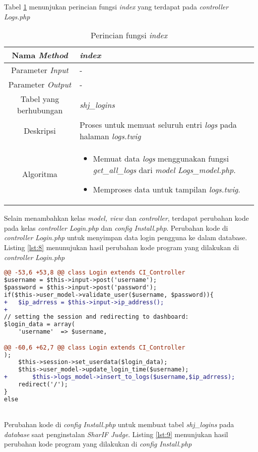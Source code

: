 \begin{enumerate}
	Tabel \ref{tab:f4logs} menunjukan perincian fungsi \textit{index} yang terdapat pada \textit{controller Logs.php}
	\begin{table}[H]
		\caption{Perincian fungsi \textit{index}}
		\label{tab:f4logs}
		\begin{tabular}{|c|p{11cm}|}
			\hline
			Nama \textit{Method} 	& 	\textit{index} 	\\
			\hline
			Parameter \textit{Input} & - \\
			\hline
			Parameter \textit{Output} &  - \\
			\hline
			Tabel yang berhubungan & \textit{shj\_logins} \\
			\hline
			Deskripsi	& Proses untuk memuat seluruh entri \textit{logs} pada halaman \textit{logs.twig}	 \\
			\hline
			Algoritma	& \begin{itemize}
				\item Memuat data \textit{logs} menggunakan fungsi \textit{get\_all\_logs} dari \textit{model Logs\_model.php}.
				\item Memproses data untuk tampilan \textit{logs.twig}.
			\end{itemize} \\
			\hline
		\end{tabular}
	\end{table}
\end{enumerate}

Selain menambahkan kelas \textit{model, view} dan \textit{controller}, terdapat perubahan kode pada kelas \textit{controller Login.php} dan \textit{config Install.php}. Perubahan kode di \textit{controller Login.php} untuk menyimpan data login pengguna ke dalam database. Listing \ref{lst:8} menunujukan hasil perubahan kode program yang dilakukan di \textit{controller Login.php}

\begin{lstlisting}[language=diff, caption=Perubahan kode program pada \textit{Login.php}, label=lst:8, basicstyle=\ttfamily, frame=single,
columns=fullflexible, keepspaces=true, breaklines=true]
@@ -53,6 +53,8 @@ class Login extends CI_Controller
$username = $this->input->post('username');
$password = $this->input->post('password');
if($this->user_model->validate_user($username, $password)){
+   $ip_adrress = $this->input->ip_address();
+
// setting the session and redirecting to dashboard:
$login_data = array(
	'username'  => $username,

@@ -60,6 +62,7 @@ class Login extends CI_Controller
);
	$this->session->set_userdata($login_data);
	$this->user_model->update_login_time($username);
+   	$this->logs_model->insert_to_logs($username,$ip_adrress);
	redirect('/');
}
else
\end{lstlisting}
~\\
Perubahan kode di \textit{config Install.php} untuk membuat tabel \textit{shj\_logins} pada \textit{database} saat penginstalan \textit{SharIF Judge}. Listing \ref{lst:9} menunjukan hasil perubahan kode program yang dilakukan di \textit{config Install.php}

